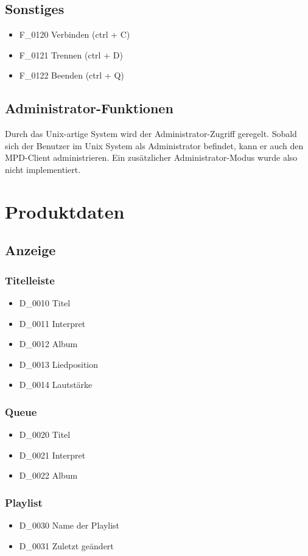 \subsection{Sonstiges}
\begin{itemize}
	\item F\_0120 Verbinden	(ctrl + C)
	\item F\_0121 Trennen	(ctrl + D)
	\item F\_0122 Beenden	(ctrl + Q)
\end{itemize}
\subsection{Administrator-Funktionen}
Durch das Unix-artige System wird der Administrator-Zugriff geregelt. Sobald sich der Benutzer im Unix System
als Administrator befindet, kann er auch den MPD-Client administrieren. Ein zusätzlicher Administrator-Modus wurde also
nicht implementiert.
\section{Produktdaten}
\subsection{Anzeige}
\subsubsection{Titelleiste}
\begin{itemize}
	\item D\_0010 Titel
	\item D\_0011 Interpret
	\item D\_0012 Album
	\item D\_0013 Liedposition
	\item D\_0014 Lautstärke
\end{itemize}
\subsubsection{Queue}
\begin{itemize}
	\item D\_0020 Titel
	\item D\_0021 Interpret
	\item D\_0022 Album
\end{itemize}
\subsubsection{Playlist}
\begin{itemize}
	\item D\_0030 Name der Playlist
	\item D\_0031 Zuletzt geändert
\end{itemize}
